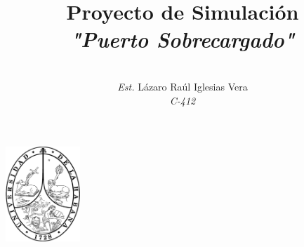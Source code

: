 \documentclass[a4paper,10pt]{article}
\begin{document}
	
	
	\begin{center}
		\includegraphics[width = 1.1in]{./images/escudo.png} 
	\end{center}
	
	
	\title{Proyecto de Simulaci\'on\\ \emph{ "Puerto Sobrecargado" }}
	
	\vspace{4mm}
	
	\author{\\
		\name \emph{Est.} L\'azaro Ra\'ul Iglesias Vera \vspace{2mm}  \\
		\emph{C-412}    
	}
	\vspace{4mm}
	\maketitle
	
	
	
	
	\ShortHeadings{}{}
	
	
	
	
\end{document}

